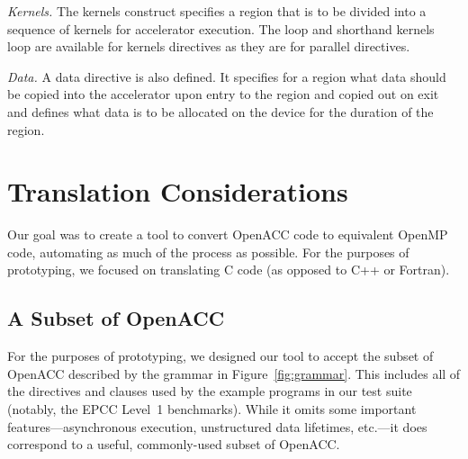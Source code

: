 \documentclass{sig-alternate-05-2015}
\begin{document}
\emph{Kernels.}
The kernels construct specifies a region that is to be divided into a sequence
of kernels for accelerator execution. The loop and shorthand kernels loop are
available for kernels directives as they are for parallel directives. 

\emph{Data.}
A data directive is also defined. It specifies for a region what data should be
copied into the accelerator upon entry to the region and copied out on exit and
defines what data is to be allocated on the device for the duration of the
region. %

\section{Translation Considerations}
\label{sec:translation}


Our goal was to create a tool to convert OpenACC code to equivalent OpenMP
code, automating as much of the process as possible.  For the purposes of
prototyping, we focused on translating C code (as opposed to C++ or Fortran).

\subsection{A Subset of OpenACC}
For the purposes of prototyping, we designed our tool to accept the subset of
OpenACC described by the grammar in Figure~\ref{fig:grammar}.  This includes
all of the directives and clauses used by the example programs in our test
suite (notably, the EPCC Level~1 benchmarks).  While it omits some important
features---asynchronous execution, unstructured data lifetimes, etc.---it does
correspond to a useful, commonly-used subset of OpenACC.
\end{document}

